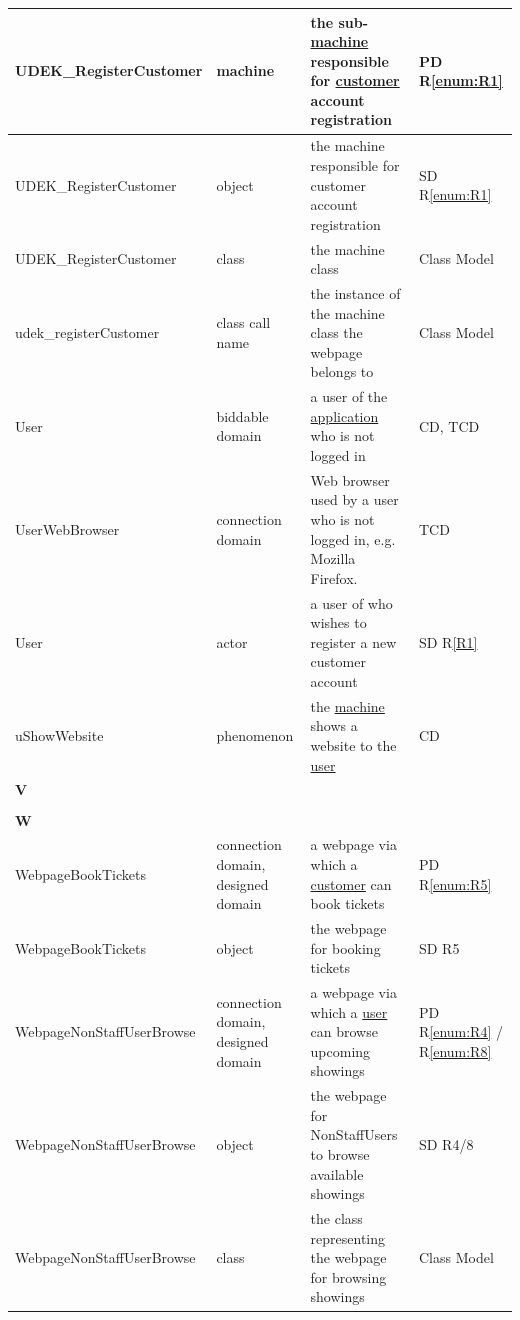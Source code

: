 \documentclass[a4paper,10pt,titlepage,bibtotoc,bibtotocnumbered]{scrreprt}
\begin{document}
\begin{longtable}{|p{4.75cm}|p{3cm}|p{5cm}|l|}
\hline
\hypertarget{glossary:UDEK-RegisterCustomer}{UDEK\_RegisterCustomer} & machine & the sub-\hyperlink{glossary:UDEKino}{machine} responsible for \hyperlink{glossary:Customer}{customer} account registration & PD R\ref{enum:R1}\\
\hline
UDEK\_RegisterCustomer & object & the machine responsible for customer account registration & SD R\ref{enum:R1}\\
\hline
UDEK\_RegisterCustomer & class & the machine class & Class Model\\
\hline
udek\_registerCustomer & class call name & the instance of the machine class the webpage belongs to & Class Model\\
\hline
\hypertarget{glossary:User}{User} & biddable domain & a user of the \hyperlink{glossary:UDEKino}{application} who is not logged in & CD, TCD\\
\hline
UserWebBrowser & connection domain & Web browser used by a user who is not logged in, e.g. Mozilla Firefox. & TCD\\
\hline
User & actor & a user of who wishes to register a new customer account & SD R\ref{R1}\\
\hline
\hypertarget{glossary:uShowWebsite}{uShowWebsite} & phenomenon & the \hyperlink{glossary:UDEKino}{machine} shows a website to the \hyperlink{glossary:User}{user} & CD\\
\hline
\multicolumn{4}{|l|}{\textbf{V}}\\
\hline
&  &  & \\
\hline
\multicolumn{4}{|l|}{\textbf{W}}\\
\hline
\hypertarget{glossary:WebpageBookTickets}{WebpageBookTickets} & connection domain, designed domain & a webpage via which a \hyperlink{glossary:Customer}{customer} can book tickets & PD R\ref{enum:R5}\\
\hline
WebpageBookTickets & object & the webpage for booking tickets & SD R5\\
\hline
\hypertarget{glossary:WebpageNonStaffUserBrowse}{WebpageNonStaffUserBrowse} & connection domain, designed domain & a webpage via which a \hyperlink{glossary:NonStaffUser}{user} can browse upcoming showings & PD R\ref{enum:R4} / R\ref{enum:R8}\\
\hline
WebpageNonStaffUserBrowse & object & the webpage for NonStaffUsers to browse available showings & SD R4/8\\
\hline
WebpageNonStaffUserBrowse & class & the class representing the webpage for browsing showings & Class Model\\

\end{longtable}
\end{document}
